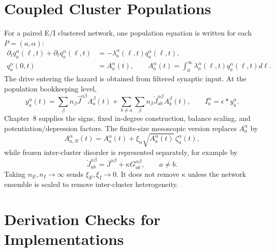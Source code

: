 \section{Coupled Cluster Populations}

For a paired E/I clustered network, one population equation is written for each
\(P=(a,\alpha)\):
\begin{align}
  \partial_t q_a^\alpha(\ell,t)+\partial_\ell q_a^\alpha(\ell,t)
  &=
  -\lambda_a^\alpha(\ell,t)q_a^\alpha(\ell,t),
  \label{eq:appA-cluster-age-pde}
  \\
  q_a^\alpha(0,t)
  &=
  A_a^\alpha(t),
  \qquad
  A_a^\alpha(t)
  =
  \int_0^\infty
  \lambda_a^\alpha(\ell,t)q_a^\alpha(\ell,t)d\ell.
  \label{eq:appA-cluster-activity}
\end{align}
The drive entering the hazard is obtained from filtered synaptic input. At the
population bookkeeping level,
\begin{equation}
  y_a^\alpha(t)
  =
  \sum_{\beta}
  n_\beta\widehat J^{\alpha\beta}A_a^\beta(t)
  +
  \sum_{b\ne a}\sum_{\beta}
  n_\beta\check J_{ab}^{\alpha\beta}A_b^\beta(t),
  \qquad
  I_a^\alpha=\epsilon*y_a^\alpha.
  \label{eq:appA-cluster-input}
\end{equation}
Chapter~8 supplies the signs, fixed in-degree construction, balance scaling,
and potentiation/depression factors. The finite-size mesoscopic version
replaces \(A_a^\alpha\) by
\begin{equation}
  A_{a,N}^\alpha(t)
  =
  A_a^\alpha(t)
  +
  \xi_\alpha\sqrt{A_a^\alpha(t)}\,\zeta_a^\alpha(t),
  \label{eq:appA-cluster-noisy-activity}
\end{equation}
while frozen inter-cluster disorder is represented separately, for example by
\begin{equation}
  \check J_{ab}^{\alpha\beta}
  =
  \overline J^{\alpha\beta}
  +
  \kappa G_{ab}^{\alpha\beta},
  \qquad a\ne b.
  \label{eq:appA-kappa-decomposition}
\end{equation}
Taking \(n_E,n_I\to\infty\) sends \(\xi_E,\xi_I\to0\). It does not remove
\(\kappa\) unless the network ensemble is scaled to remove inter-cluster
heterogeneity.

\section{Derivation Checks for Implementations}

